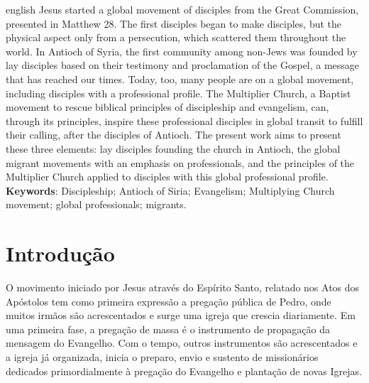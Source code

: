 \documentclass[12pt,openright,oneside,a4paper,
english,french,spanish,brazil]{abntex2}
\begin{document}
\begin{resumo}[Abstract] 
\begin{otherlanguage*}{english}
	Jesus started a global movement of disciples from the Great Commission, presented in Matthew 28. The first disciples began to make disciples, but the physical aspect only from a persecution, which scattered them throughout the world. In Antioch of Syria, the first community among non-Jews was founded by lay disciples based on their testimony and proclamation of the Gospel, a message that has reached our times. Today, too, many people are on a global movement, including disciples with a professional profile. The Multiplier Church, a Baptist movement to rescue biblical principles of discipleship and evangelism, can, through its principles, inspire these professional disciples in global transit to fulfill their calling, after the disciples of Antioch. The present work aims to present these three elements: lay disciples founding the church in Antioch, the global migrant movements with an emphasis on professionals, and the principles of the Multiplier Church applied to disciples with this global professional profile.
\vspace{\onelineskip} 
\noindent \textbf{Keywords}: Discipleship; Antioch of Siria; Evangelism; Multiplying Church movement; global professionals; migrants.
\end{otherlanguage*} 
\end{resumo} 


\tableofcontents* %

\textual

\chapter*{Introdução}

O movimento iniciado por Jesus através do Espírito Santo, relatado nos Atos dos Apóstolos tem como primeira expressão a pregação pública de Pedro, onde muitos irmãos são acrescentados e surge uma igreja que crescia diariamente. Em uma primeira fase, a pregação de massa é o instrumento de propagação da mensagem do Evangelho. Com o tempo, outros instrumentos são acrescentados e a igreja já organizada, inicia o preparo, envio e sustento de missionários dedicados primordialmente à pregação do Evangelho e plantação de novas Igrejas. 
\end{document}
